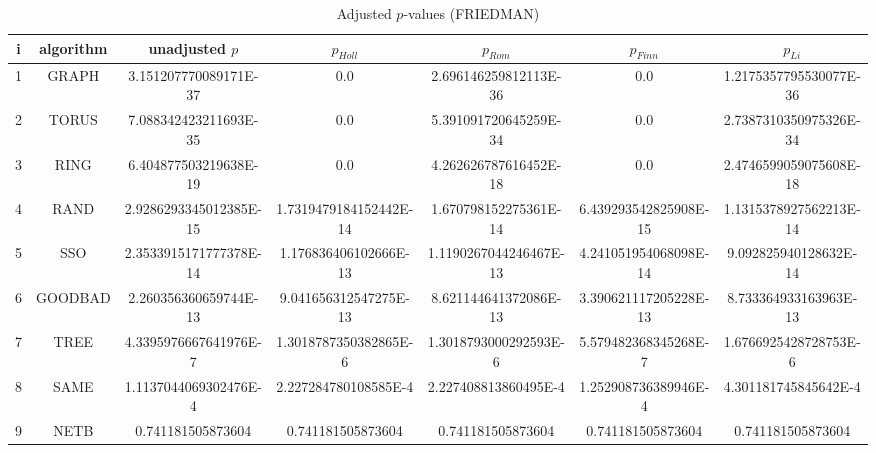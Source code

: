 \documentclass[a4paper,10pt]{article}
\begin{document}
\begin{landscape}
\begin{table}[!htp]
\centering\scriptsize
\caption{Adjusted $p$-values (FRIEDMAN)}
\begin{tabular}{ccccccc}
i&algorithm&unadjusted $p$&$p_{Holl}$&$p_{Rom}$&$p_{Finn}$&$p_{Li}$\\
\hline
1& GRAPH&3.151207770089171E-37&0.0&2.696146259812113E-36&0.0&1.2175357795530077E-36\\
2& TORUS&7.088342423211693E-35&0.0&5.391091720645259E-34&0.0&2.7387310350975326E-34\\
3& RING&6.404877503219638E-19&0.0&4.262626787616452E-18&0.0&2.4746599059075608E-18\\
4& RAND&2.9286293345012385E-15&1.7319479184152442E-14&1.670798152275361E-14&6.439293542825908E-15&1.1315378927562213E-14\\
5& SSO&2.3533915171777378E-14&1.176836406102666E-13&1.1190267044246467E-13&4.241051954068098E-14&9.092825940128632E-14\\
6& GOODBAD&2.260356360659744E-13&9.041656312547275E-13&8.621144641372086E-13&3.390621117205228E-13&8.733364933163963E-13\\
7& TREE&4.3395976667641976E-7&1.3018787350382865E-6&1.3018793000292593E-6&5.579482368345268E-7&1.6766925428728753E-6\\
8& SAME&1.1137044069302476E-4&2.227284780108585E-4&2.227408813860495E-4&1.252908736389946E-4&4.301181745845642E-4\\
9& NETB&0.741181505873604&0.741181505873604&0.741181505873604&0.741181505873604&0.741181505873604\\
\hline
\end{tabular}
\end{table}


\newpage


\end{landscape}
\end{document}
